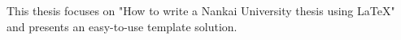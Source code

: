 
\begin{abstract}

本论文以“如何利用 \LaTeX 写一篇南开大学学位论文”为主题，提出了一个易用的模板方案。


\end{abstract}

\begin{abstract*}

This thesis focuses on "How to write a Nankai University thesis using \LaTeX" and presents an easy-to-use template solution.


\end{abstract*}